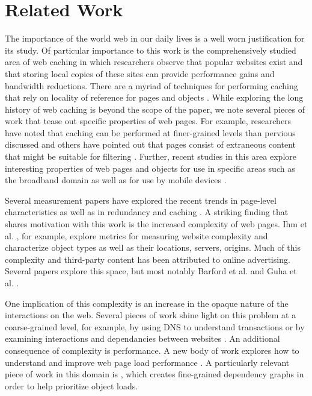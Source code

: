 \section{Related Work}
\label{sec:related}

The importance of the world web in our daily lives is a well worn
justification for its study. Of particular importance to this work is
the comprehensively studied area of web caching in which researchers
observe that popular websites exist and that storing local copies of
these sites can provide performance gains and bandwidth
reductions\cite{breslau1999web}. There are a myriad of techniques for
performing caching that rely on locality of reference for pages and
objects \cite{rabinovich2002web}. While exploring the long history of
web caching is beyond the scope of the paper, we note several pieces
of work that tease out specific properties of web pages. For example,
researchers have noted that caching can be performed at finer-grained
levels than pervious discussed \cite{Wang:2014:MWM:2663716.2663739}
and others have pointed out that pages consist of extraneous content
that might be suitable for filtering
\cite{Krishnamurthy:2006:CMC:1135777.1135829}. Further, recent studies
in this area explore interesting properties of web pages and objects
for use in specific areas such as the broadband domain
\cite{sundaresan2013measuring} as well as for use by mobile devices
\cite{Qian:2012:WCS:2307636.2307649}.

Several measurement papers have explored the recent trends in
page-level characteristics as well as in redundancy and caching
\cite{ihm2011towards}. A striking finding that shares motivation with
this work is the increased complexity of web pages. Ihm et
al. \cite{butkiewicz2011understanding,ihm2011towards}, for example,
explore metrics for measuring website complexity and characterize
object types as well as their locations, servers, origins. Much of
this complexity and third-party content has been attributed to online
advertising. Several papers explore this space, but most notably
Barford et al.  \cite{Barford:2014:AHA:2566486.2567992} and Guha et
al. \cite{Guha:2010:CMO:1879141.1879152}.

One implication of this complexity is an increase in the opaque nature
of the interactions on the web. Several pieces of work shine light on
this problem at a coarse-grained level, for example, by using DNS to
understand transactions \cite{Bermudez:2012:DRD:2398776.2398819} or by
examining interactions and dependancies between websites
\cite{Pujol:2014:BWT:2663716.2663756}. An additional consequence of
complexity is performance. A new body of work explores how to
understand and improve web page load performance \cite{180330}. A
particularly relevant piece of work in this domain is \cite{194916},
which creates fine-grained dependency graphs in order to help
prioritize object loads.

